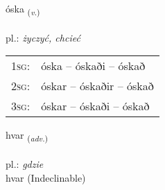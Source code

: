 \documentclass[frontgrid, backgrid]{flacards}\usepackage[]{graphicx}\usepackage[]{xcolor}
\begin{document}
\renewcommand{\flhead}{\vskip5pt \fboxsep=0pt {\small\bfseries\footnotesize Sagnorð | czasownik}}
\renewcommand{\fcfoot}{\vskip5pt \fboxsep=0pt \hspace{2pt}{\small\bfseries\footnotesize 1K}}

\renewcommand{\blhead}{\vskip5pt {\small\bfseries\footnotesize Sagnorð | czasownik }}
\renewcommand{\bcfoot}{\vskip5pt \hspace{2pt}{\small\bfseries\footnotesize 1K}}


{óska \small{\textsubscript{(\textit{v.})}} \\[1ex] %
\textphonetic{[ouska]} \\
pl.: \emph{życzyć, chcieć} \\  [2ex]
\renewcommand*{\arraystretch}{0.8}
\begin{tabular}{p{1cm}l}
\textsc{1sg}: & óska -- óskaði -- óskað \\ 
\textsc{2sg}: & óskar -- óskaðir -- óskað \\ 
\textsc{3sg}: & óskar -- óskaði -- óskað \\ 
\end{tabular}
}


\renewcommand{\flhead}{\vskip5pt \fboxsep=0pt {\small\bfseries\footnotesize Atviksorð | przysłówek}}
\renewcommand{\fcfoot}{\vskip5pt \fboxsep=0pt \hspace{2pt}{\small\bfseries\footnotesize 1K}}

\renewcommand{\blhead}{\vskip5pt {\small\bfseries\footnotesize Atviksorð | przysłówek }}
\renewcommand{\bcfoot}{\vskip5pt \hspace{2pt}{\small\bfseries\footnotesize 1K}}


{hvar \small{\textsubscript{(\textit{adv.})}} \\[1ex]
\textphonetic{[kʰvaːr]} \\
pl.: \emph{gdzie} \\  [2ex]
hvar (Indeclinable)}
\end{document}
